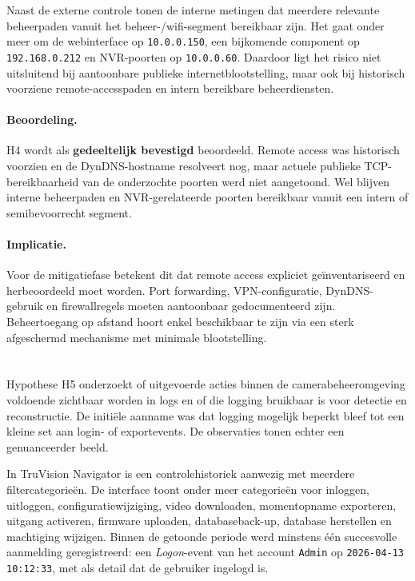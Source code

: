 Naast de externe controle tonen de interne metingen dat meerdere relevante beheerpaden vanuit het beheer-/wifi-segment bereikbaar zijn. Het gaat onder meer om de webinterface op \texttt{10.0.0.150}, een bijkomende component op \texttt{192.168.0.212} en NVR-poorten op \texttt{10.0.0.60}. Daardoor ligt het risico niet uitsluitend bij aantoonbare publieke internetblootstelling, maar ook bij historisch voorziene remote-accesspaden en intern bereikbare beheerdiensten.

\paragraph{Beoordeling.}
H4 wordt als \textbf{gedeeltelijk bevestigd} beoordeeld. Remote access was historisch voorzien en de DynDNS-hostname resolveert nog, maar actuele publieke TCP-bereikbaarheid van de onderzochte poorten werd niet aangetoond. Wel blijven interne beheerpaden en NVR-gerelateerde poorten bereikbaar vanuit een intern of semibevoorrecht segment.

\paragraph{Implicatie.}
Voor de mitigatiefase betekent dit dat remote access expliciet geïnventariseerd en herbeoordeeld moet worden. Port forwarding, VPN-configuratie, DynDNS-gebruik en firewallregels moeten aantoonbaar gedocumenteerd zijn. Beheertoegang op afstand hoort enkel beschikbaar te zijn via een sterk afgeschermd mechanisme met minimale blootstelling.


\section{}%
\label{sec:h5-logging}

Hypothese H5 onderzoekt of uitgevoerde acties binnen de camerabeheeromgeving voldoende zichtbaar worden in logs en of die logging bruikbaar is voor detectie en reconstructie. De initiële aanname was dat logging mogelijk beperkt bleef tot een kleine set aan login- of exportevents. De observaties tonen echter een genuanceerder beeld.

In TruVision Navigator is een controlehistoriek aanwezig met meerdere filtercategorieën. De interface toont onder meer categorieën voor inloggen, uitloggen, configuratiewijziging, video downloaden, momentopname exporteren, uitgang activeren, firmware uploaden, databaseback-up, database herstellen en machtiging wijzigen. Binnen de getoonde periode werd minstens één succesvolle aanmelding geregistreerd: een \textit{Logon}-event van het account \texttt{Admin} op \texttt{2026-04-13 10:12:33}, met als detail dat de gebruiker ingelogd is.

